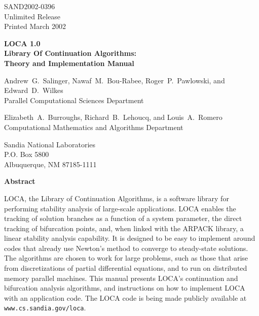 \documentclass[12pt]{report}
\begin{document}
\begin{center}
SAND2002-0396\\
Unlimited Release\\
Printed March 2002

\vskip 28pt
{\bf {\huge LOCA 1.0}\vspace{3pt} \\
{\LARGE Library Of Continuation Algorithms:\vspace{3pt}\\
{Theory and Implementation Manual}}}
\vskip 28pt

Andrew~G.~Salinger, Nawaf~M.~Bou-Rabee, Roger~P.~Pawlowski, and Edward~D.~Wilkes\\
Parallel Computational Sciences Department 

Elizabeth~A.~Burroughs, Richard~B.~Lehoucq, and Louis~A.~Romero \\
Computational Mathematics and Algorithms Department

Sandia National Laboratories \\
P.O. Box 5800\\
Albuquerque, NM 87185-1111

\vskip 48pt
{\Large\bf Abstract }\\
\vskip 12pt

LOCA, the Library of Continuation Algorithms, is a software library for performing stability analysis of large-scale applications. LOCA enables
 the tracking of solution branches as a function of a system parameter, the direct tracking of bifurcation points, and, when linked with the ARPACK library, a linear stability analysis capability. It is designed to be easy to implement around codes
that already use Newton's method to converge to steady-state solutions. 
The algorithms are chosen to work for large problems, such as those that arise from
 discretizations of partial differential equations, and to run on distributed memory parallel machines. This manual presents LOCA's continuation and bifurcation analysis
algorithms, and instructions on how to implement LOCA with an application code. The 
LOCA code is being made publicly available at \texttt{www.cs.sandia.gov/loca}.

\setcounter{page}{3}

\end{center}
\clearpage

\sloppy
\pagestyle{headings}
\end{document}
